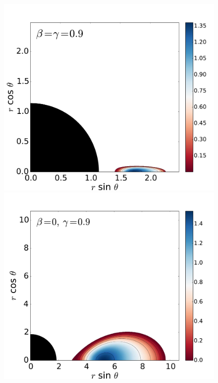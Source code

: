 \documentclass[]{aa}
\begin{document}
\begin{figure}
\includegraphics[scale=0.14]{figures/fig2_3_3.pdf}
\\
\includegraphics[scale=0.14]{figures/fig2_4_1.pdf}
\hspace{-0.3cm}

\end{figure}
\end{document}
